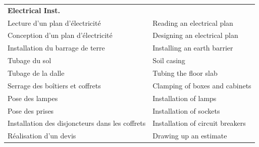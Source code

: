 \documentclass[
  a4paper, twoside, 12pt]{book}
\begin{document}
\begin{longtable}[]{@{}
  >{\raggedright\arraybackslash}p{}
  >{\raggedright\arraybackslash}p{}@{}}
\textbf{Electrical Inst.} & \\
Lecture d'un plan d'électricité & Reading an electrical plan \\
Conception d'un plan d'électricité & Designing an electrical plan \\
Installation du barrage de terre & Installing an earth barrier \\
Tubage du sol & Soil casing \\
Tubage de la dalle & Tubing the floor slab \\
Serrage des boîtiers et coffrets & Clamping of boxes and cabinets \\
Pose des lampes & Installation of lamps \\
Pose des prises & Installation of sockets \\
Installation des disjoncteurs dans les coffrets & Installation of circuit breakers \\
Réalisation d'un devis & Drawing up an estimate \\
\end{longtable}
\end{document}
